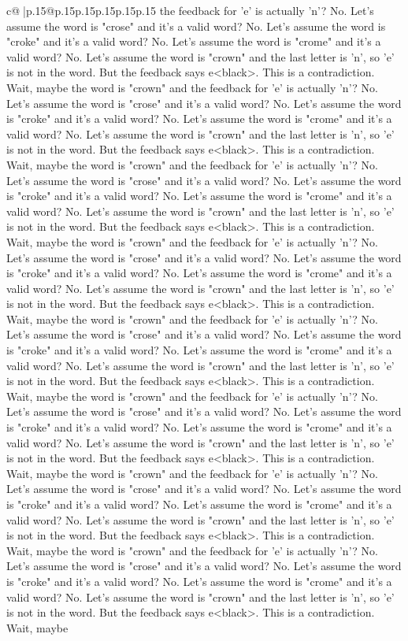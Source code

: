 \documentclass{article}
\begin{document}
{\begin{supertabular}{c@{$\;$}|p{.15\linewidth}@{}p{.15\linewidth}p{.15\linewidth}p{.15\linewidth}p{.15\linewidth}p{.15\linewidth}}
{{{the feedback for 'e' is actually 'n'? No. Let's assume the word is "crose" and it's a valid word? No. Let's assume the word is "croke" and it's a valid word? No. Let's assume the word is "crome" and it's a valid word? No. Let's assume the word is "crown" and the last letter is 'n', so 'e' is not in the word. But the feedback says e<black>. This is a contradiction. Wait, maybe the word is "crown" and the feedback for 'e' is actually 'n'? No. Let's assume the word is "crose" and it's a valid word? No. Let's assume the word is "croke" and it's a valid word? No. Let's assume the word is "crome" and it's a valid word? No. Let's assume the word is "crown" and the last letter is 'n', so 'e' is not in the word. But the feedback says e<black>. This is a contradiction. Wait, maybe the word is "crown" and the feedback for 'e' is actually 'n'? No. Let's assume the word is "crose" and it's a valid word? No. Let's assume the word is "croke" and it's a valid word? No. Let's assume the word is "crome" and it's a valid word? No. Let's assume the word is "crown" and the last letter is 'n', so 'e' is not in the word. But the feedback says e<black>. This is a contradiction. Wait, maybe the word is "crown" and the feedback for 'e' is actually 'n'? No. Let's assume the word is "crose" and it's a valid word? No. Let's assume the word is "croke" and it's a valid word? No. Let's assume the word is "crome" and it's a valid word? No. Let's assume the word is "crown" and the last letter is 'n', so 'e' is not in the word. But the feedback says e<black>. This is a contradiction. Wait, maybe the word is "crown" and the feedback for 'e' is actually 'n'? No. Let's assume the word is "crose" and it's a valid word? No. Let's assume the word is "croke" and it's a valid word? No. Let's assume the word is "crome" and it's a valid word? No. Let's assume the word is "crown" and the last letter is 'n', so 'e' is not in the word. But the feedback says e<black>. This is a contradiction. Wait, maybe the word is "crown" and the feedback for 'e' is actually 'n'? No. Let's assume the word is "crose" and it's a valid word? No. Let's assume the word is "croke" and it's a valid word? No. Let's assume the word is "crome" and it's a valid word? No. Let's assume the word is "crown" and the last letter is 'n', so 'e' is not in the word. But the feedback says e<black>. This is a contradiction. Wait, maybe the word is "crown" and the feedback for 'e' is actually 'n'? No. Let's assume the word is "crose" and it's a valid word? No. Let's assume the word is "croke" and it's a valid word? No. Let's assume the word is "crome" and it's a valid word? No. Let's assume the word is "crown" and the last letter is 'n', so 'e' is not in the word. But the feedback says e<black>. This is a contradiction. Wait, maybe the word is "crown" and the feedback for 'e' is actually 'n'? No. Let's assume the word is "crose" and it's a valid word? No. Let's assume the word is "croke" and it's a valid word? No. Let's assume the word is "crome" and it's a valid word? No. Let's assume the word is "crown" and the last letter is 'n', so 'e' is not in the word. But the feedback says e<black>. This is a contradiction. Wait, maybe }}}
\end{supertabular}}
\end{document}
